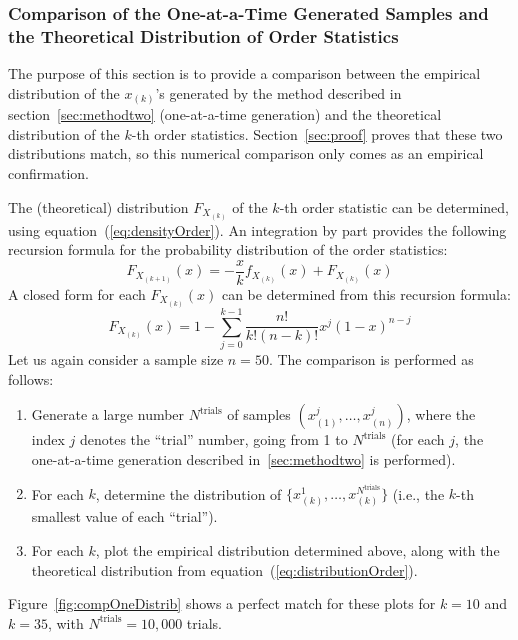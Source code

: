 \documentclass[12pt]{article} %
\begin{document}
\subsubsection{Comparison of the One-at-a-Time Generated Samples and the Theoretical Distribution of Order Statistics}
The purpose of this section is to provide a comparison between the
empirical distribution of the $x_{(k)}$'s generated by the method
described in section~\ref{sec:methodtwo} (one-at-a-time generation)
and the theoretical distribution of the $k$-th order
statistics. Section~\ref{sec:proof} proves that these two
distributions match, so this numerical comparison only comes as an
empirical confirmation.\par
The (theoretical) distribution $F_{X_{(k)}}$ of the $k$-th order
statistic can be determined, using
equation~(\ref{eq:densityOrder}). An integration by part provides the
following recursion formula for the probability distribution of the
order statistics:
\begin{equation}
F_{X_{(k+1)}}(x) = -\frac{x}{k} f_{X_{(k)}}(x) + F_{X_{(k)}}(x)
\end{equation}
A closed form for each $F_{X_{(k)}}(x)$ can be determined from this recursion
formula:
\begin{equation}\label{eq:distributionOrder}
F_{X_{(k)}}(x) = 1 - \sum_{j=0}^{k-1} \frac{n!}{k!(n-k)!}x^j(1-x)^{n-j}
\end{equation}
Let us again consider a sample size $n=50$. The comparison is performed
as follows:
\begin{enumerate}
\item Generate a large number $N^\text{trials}$ of samples
  $(x^j_{(1)},\ldots,x^j_{(n)})$, where the index $j$ denotes the
  ``trial'' number, going from 1 to $N^\text{trials}$ (for each $j$,
  the one-at-a-time generation described in~\ref{sec:methodtwo} is
  performed).
\item For each $k$, determine the distribution of
  $\{x^1_{(k)},\ldots,x^{N^\text{trials}}_{(k)}\}$ (i.e., the $k$-th
  smallest value of each ``trial'').
\item For each $k$, plot the empirical distribution determined above,
  along with the theoretical distribution from
  equation~(\ref{eq:distributionOrder}).
\end{enumerate}
Figure~\ref{fig:compOneDistrib} shows a perfect match for these plots
for $k=10$ and $k=35$, with $N^\text{trials}=10,000$ trials.
\end{document}
